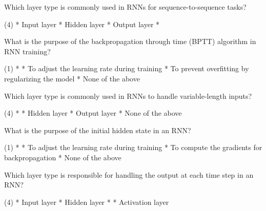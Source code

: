 \documentclass[10pt]{extarticle}
\begin{document}
\begin{exercise}
    Which layer type is commonly used in RNNs for sequence-to-sequence tasks?
    \begin{choice} (4)
        * Input layer
        * Hidden layer
        * Output layer
        * 
    \end{choice}
\end{exercise}
\begin{solution}
\end{solution}

\begin{exercise}
    What is the purpose of the backpropagation through time (BPTT) algorithm in RNN training?
    \begin{choice} (1)
        * 
        * To adjust the learning rate during training
        * To prevent overfitting by regularizing the model
        * None of the above
    \end{choice}
\end{exercise}
\begin{solution}
\end{solution}

\begin{exercise}
    Which layer type is commonly used in RNNs to handle variable-length inputs?
    \begin{choice} (4)
        * 
        * Hidden layer
        * Output layer
        * None of the above
    \end{choice}
\end{exercise}
\begin{solution}
\end{solution}

\begin{exercise}
    What is the purpose of the initial hidden state in an RNN?
    \begin{choice} (1)
        * 
        * To adjust the learning rate during training
        * To compute the gradients for backpropagation
        * None of the above
    \end{choice}
\end{exercise}
\begin{solution}
\end{solution}

\begin{exercise}
    Which layer type is responsible for handling the output at each time step in an RNN?
    \begin{choice} (4)
        * Input layer
        * Hidden layer
        * 
        * Activation layer
    \end{choice}
\end{exercise}
\begin{solution}
\end{solution}
\end{document}
